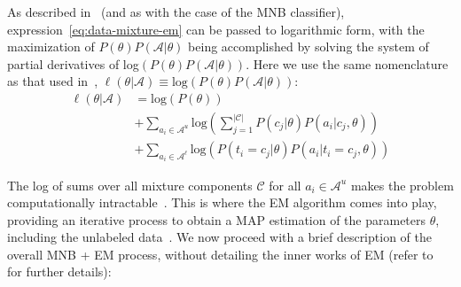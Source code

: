 As described in~\cite{Nigam2000} (and as with the case of the MNB 
classifier), expression~\ref{eq:data-mixture-em} can be passed to logarithmic 
form, with the maximization of $P(\theta)P(\mathcal{A}|\theta)$ being 
accomplished by solving the system of partial derivatives of 
log$(P(\theta)P(\mathcal{A}|\theta))$. Here we use the same nomenclature as that 
used in~\cite{Nigam2000}, $\ell(\theta|\mathcal{A}) \equiv 
\text{log}(P(\theta)P(\mathcal{A}|\theta))$:
\begin{equation}
\begin{split}
    \ell\left(\theta|\mathcal{A}\right) &= \text{log}\left(P(\theta)\right)\\
        &+ \sum_{a_i \in \mathcal{A}^{u}}\text{log}\left(\sum_{j=1}^{|\mathcal{C}|}P(c_j|\theta)P(a_i|c_j,\theta)\right)\\ 
        &+ \sum_{a_i \in \mathcal{A}^{\ell}}\text{log}\left(P(t_i = c_j|\theta)P(a_i|t_i = c_j,\theta)\right)
    \label{eq:log}
\end{split}
\end{equation}

The log of sums over all mixture components $\mathcal{C}$ for all $a_i \in 
\mathcal{A}^{u}$ makes the problem computationally 
intractable~\cite{Nigam2000}. This is where the EM algorithm comes into play, 
providing an iterative process to obtain a MAP estimation of the parameters 
$\theta$, including the unlabeled data~\cite{Nigam2000}. We now proceed with a brief 
description of the overall MNB + EM process, without detailing the inner works 
of EM (refer to~\cite{Nigam2000} for further details):

